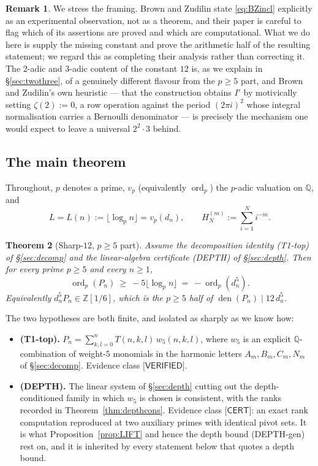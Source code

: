 \documentclass[11pt,reqno]{amsart}
\theoremstyle{plain}
\newtheorem{theorem}{Theorem}[section]
\theoremstyle{definition}
\newtheorem{remark}[theorem]{Remark}
\theoremstyle{remark}
\numberwithin{equation}{section}
\newcommand{\ZZ}{\mathbb{Z}}
\newcommand{\QQ}{\mathbb{Q}}
\newcommand{\ord}{\operatorname{ord}}
\newcommand{\den}{\operatorname{den}}
\newcommand{\wfive}{w_5}
\newcommand{\VERIFIED}{\textsf{[VERIFIED]}}
\newcommand{\CERT}{\textsf{[CERT]}}
\begin{document}
\begin{remark}
We stress the framing. Brown and Zudilin state \eqref{eq:BZincl} explicitly as an experimental
observation, not as a theorem, and their paper is careful to flag which of its assertions are
proved and which are computational. What we do here is supply the missing constant and prove
the arithmetic half of the resulting statement; we regard this as completing their analysis
rather than correcting it. The $2$-adic and $3$-adic content of the constant $12$ is, as we
explain in \S\ref{sec:twothree}, of a genuinely different flavour from the $p\ge5$ part, and
Brown and Zudilin's own heuristic --- that the construction obtains $I'$ by motivically
setting $\zeta(2):=0$, a row operation against the period $(2\pi i)^2$ whose integral
normalisation carries a Bernoulli denominator --- is precisely the mechanism one would expect
to leave a universal $2^2\cdot3$ behind.
\end{remark}

\subsection{The main theorem}

Throughout, $p$ denotes a prime, $v_p$ (equivalently $\ord_p$) the $p$-adic valuation on
$\QQ$, and
\[
L=L(n):=\lfloor\log_p n\rfloor=v_p(d_n),\qquad H^{(m)}_N:=\sum_{i=1}^{N}i^{-m}.
\]

\begin{theorem}[Sharp-$12$, $p\ge5$ part]\label{thm:main}
Assume the decomposition identity \textup{(T1-top)} of \S\ref{sec:decomp} and the
linear-algebra certificate \textup{(DEPTH)} of \S\ref{sec:depth}. Then for every
prime $p\ge5$ and every $n\ge1$,
\[
\ord_p(P_n)\ \ge\ -5\lfloor\log_p n\rfloor\ =\ -\ord_p(d_n^5).
\]
Equivalently $d_n^5P_n\in\ZZ[1/6]$, which is the $p\ge5$ half of $\den(P_n)\mid 12\,d_n^5$.
\end{theorem}

The two hypotheses are both finite, and isolated as sharply as we know how:

\begin{itemize}[leftmargin=1.6em]
\item \textbf{(T1-top).} $P_n=\sum_{k,l=0}^{n}T(n,k,l)\,\wfive(n,k,l)$, where $\wfive$ is an
  explicit $\QQ$-combination of weight-$5$ monomials in the harmonic letters
  $A_m,B_m,C_m,N_m$ of \S\ref{sec:decomp}. Evidence class $\VERIFIED$.
\item \textbf{(DEPTH).} The linear system of \S\ref{sec:depth} cutting out the
  depth-conditioned family in which $\wfive$ is chosen is consistent, with the ranks recorded
  in Theorem~\ref{thm:depthcons}. Evidence class $\CERT$: an exact rank computation reproduced
  at two auxiliary primes with identical pivot sets. It is what Proposition~\ref{prop:LIFT}
  and hence the depth bound (DEPTH-gen) rest on, and it is inherited by every statement below
  that quotes a depth bound.
\end{itemize}
\end{document}
